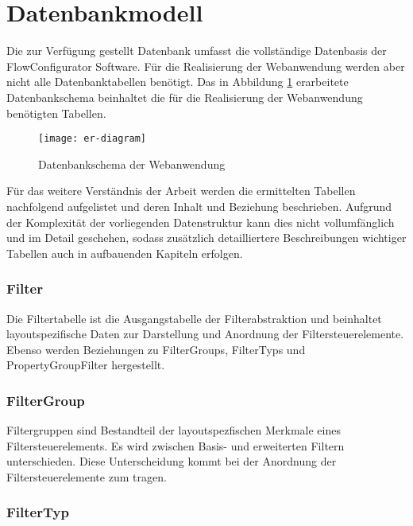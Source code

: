 \section{Datenbankmodell}
\label{sec:Entwurf:Datenbankmodell}

Die zur Verfügung gestellt Datenbank umfasst die vollständige Datenbasis der FlowConfigurator Software. Für die Realisierung der Webanwendung werden aber nicht alle Datenbanktabellen benötigt. Das in Abbildung \ref{fig:erdiagram} erarbeitete Datenbankschema beinhaltet die für die Realisierung der Webanwendung benötigten Tabellen.

\begin{figure}[H]
\centering

\texttt{[image: er-diagram]} %
\caption{Datenbankschema der Webanwendung}
\label{fig:erdiagram}
\end{figure}

Für das weitere Verständnis der Arbeit werden die ermittelten Tabellen nachfolgend aufgelistet und deren Inhalt und Beziehung beschrieben. Aufgrund der Komplexität der vorliegenden Datenstruktur kann dies nicht vollumfänglich und im Detail geschehen, sodass zusätzlich detailliertere Beschreibungen wichtiger Tabellen auch in aufbauenden Kapiteln erfolgen.

\subsubsection{Filter}

Die Filtertabelle ist die Ausgangstabelle der Filterabstraktion und beinhaltet layoutspezifische Daten zur Darstellung und Anordnung der Filtersteuerelemente. Ebenso werden Beziehungen zu FilterGroups, FilterTyps und PropertyGroupFilter hergestellt.

\subsubsection{FilterGroup}

Filtergruppen sind Bestandteil der layoutspezfischen Merkmale eines Filtersteuerelements. Es wird zwischen Basis- und erweiterten Filtern unterschieden. Diese Unterscheidung kommt bei der Anordnung der Filtersteuerelemente zum tragen.

\subsubsection{FilterTyp}

